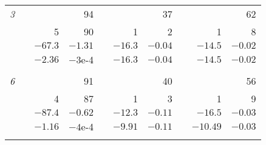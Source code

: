 \documentclass[11pt]{article}
\newcommand{\0}{\phantom{0}}
\begin{document}
\begin{table}[!htbp]
\begin{threeparttable}
\begin{tabular}{lrrrrrrrrr}
			{\it 3}  &  &                           & 94      &                               &         & 37                       &  &          & 62      \\
			         &  & 5                         & 90      &                               & 1       & 2                        &  & 1        & 8       \\
			         &  & $-67.3$                   & $-1.31$ &                               & $-16.3$ & $-0.04$                  &  & $-14.5$  & $-0.02$ \\
			         &  & $-2.36$                   & $-3$e-4 &                               & $-16.3$ & $-0.04$                  &  & $-14.5$  & $-0.02$ \\ \\[-0.3cm]

			{\it 6}  &  &                           & 91      &                               &         & 40                       &  &          & 56      \\
			         &  & 4                         & 87      &                               & 1       & 3                        &  & 1        & 9       \\
			         &  & $-87.4$                   & $-0.62$ &                               & $-12.3$ & $-0.11$                  &  & $-16.5$  & $-0.03$ \\
			         &  & $-1.16$                   & $-4$e-4 &                               & $-9.91$ & $-0.11$                  &  & $-10.49$ & $-0.03$ \\ \\[-0.3cm]


\end{tabular}
\end{threeparttable}
\end{table}
\end{document}
